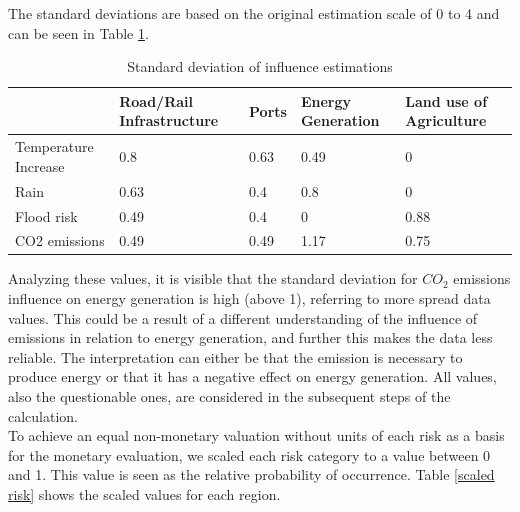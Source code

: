 \documentclass[10pt,a4paper]{article}
\begin{document}
    \vspace{-.0cm}
    The standard deviations are based on the original estimation scale of 0 to 4 and can be seen in Table \ref{est dev}.
    \begin{table}[H]
    \centering
    \begin{tabular}{|l|l|l|l|l|}
    \hline
                         & Road/Rail Infrastructure & Ports & Energy Generation & Land use of Agriculture \\ \hline
    Temperature Increase & 0.8                      & 0.63  & 0.49              & 0                       \\ \hline
    Rain                 & 0.63                     & 0.4   & 0.8               & 0                       \\ \hline
    Flood risk           & 0.49                     & 0.4   & 0                 & 0.88                    \\ \hline
    CO2 emissions        & 0.49                     & 0.49  & 1.17              & 0.75                 
    \\ \hline
    \end{tabular}
    \caption{Standard deviation of influence estimations}
    \label{est dev}
    \end{table}
    \vspace{-.0cm}
    
    Analyzing these values, it is visible that the standard deviation for $CO_2$ emissions influence on energy generation is high (above 1), referring to more spread data values. This could be a result of a different understanding of the influence of emissions in relation to energy generation, and further this makes the data less reliable. The interpretation can either be that the emission is necessary to produce energy or that it has a negative effect on energy generation. All values, also the questionable ones, are considered in the subsequent steps of the calculation.\\
    To achieve an equal non-monetary valuation without units of each risk as a basis for the monetary evaluation, we scaled each risk category to a value between 0 and 1. This value is seen as the relative probability of occurrence. Table \ref{scaled risk} shows the scaled values for each region.
\end{document}
